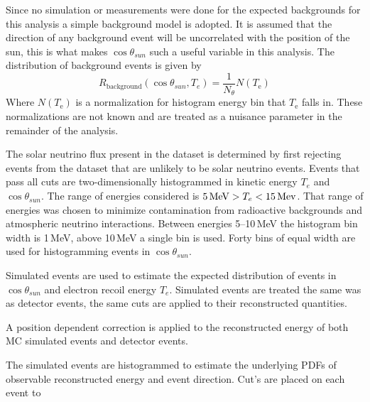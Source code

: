 Since no simulation or measurements were done for the expected backgrounds for this analysis
a simple background model is adopted.
It is assumed that the direction of any background event will be uncorrelated
with the position of the sun, this is what makes $\cos\theta_{sun}$ such a
useful variable in this analysis.
The distribution of background events is given by
\begin{equation}
    R_{\mathrm{background}}(\cos\theta_{sun}, T_{e}) = \frac{1}{N_\theta}N(T_{\mathrm{e}})
\end{equation}
Where $N(T_{\mathrm{e}})$ is a normalization for histogram energy bin that $T_{\mathrm{e}}$
falls in.
These normalizations are not known and are treated as a nuisance parameter
in the remainder of the analysis.

The solar neutrino flux present in the dataset is determined by first
rejecting events from the dataset that are unlikely to be solar neutrino events.
Events that pass all cuts are two-dimensionally histogrammed in kinetic energy $T_{e}$ and
$\cos\theta_{sun}$.
The range of energies considered is $5\text{\,MeV} > T_{e} < 15\text{\,Mev}$.
That range of energies was chosen to minimize contamination from radioactive
backgrounds and atmospheric neutrino interactions.
Between energies \numrange{5}{10}\,MeV the histogram bin width
is 1\,MeV, above 10\,MeV a single bin is used.
Forty bins of equal width are used for histogramming events in $\cos\theta_{sun}$.

Simulated events are used to estimate the expected distribution of events in
$\cos\theta_{sun}$ and electron recoil energy $T_{e}$.
Simulated events are treated the same was as detector events, the same
cuts are applied to their reconstructed quantities.

A position dependent correction is applied to the reconstructed energy
of both MC simulated events and detector events.

The simulated events are histogrammed to estimate the underlying PDFs
of observable reconstructed energy and event direction. Cut's are placed
on each event to
